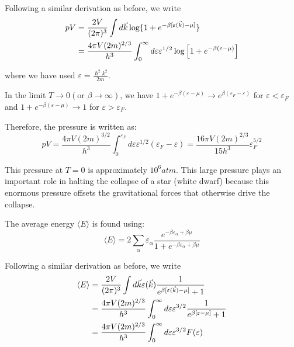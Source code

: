 \documentclass[book.tex]{subfiles}
\begin{document}
Following a similar derivation as before, we write
\begin{align}\label{Eq10}
pV &= \frac{2V}{(2\pi)^3} \int d\vec{k} \log \{ 1 + e^{-\beta [ \varepsilon (\vec{k}) - \mu]} \} \notag\\
&= \frac{4\pi V (2m)^{2/3}}{h^3} \int_0^\infty d\varepsilon \varepsilon^{1/2} \log \left[ 1 + e^{-\beta ( \varepsilon - \mu)} \right]
\end{align}

\noindent where we have used $\varepsilon = \frac{\hslash^2 k^2}{2m}$.

In the limit $T \rightarrow 0 (\text{or } \beta \rightarrow \infty)$, we have $ 1 + e^{-\beta ( \varepsilon - \mu)} \rightarrow  e^{\beta ( \varepsilon_F - \varepsilon)}$ for $\varepsilon < \varepsilon_F$ and $ 1 + e^{-\beta ( \varepsilon - \mu)} \rightarrow 1$ for $\varepsilon > \varepsilon_F$.

Therefore, the pressure is written as:
\begin{equation}\label{Eq11}
pV = \frac{4\pi V (2m)^{3/2}}{h^3} \int_0^{\varepsilon_F} d\varepsilon \varepsilon^{1/2} (\varepsilon_F - \varepsilon) = \frac{16\pi V (2m)^{2/3}}{15h^3} \varepsilon_F^{5/2} 
\end{equation}

This pressure at $T = 0$ is approximately $10^6atm$. This large pressure plays an important role in halting the collapse of a star
(white dwarf) because this enormous pressure offsets the gravitational forces that otherwise drive the collapse.

The average energy $\langle E \rangle$ is found using:
\begin{equation}\label{Eq12}
\langle E \rangle = 2\sum_\alpha \varepsilon_\alpha \frac{e^{-\beta \varepsilon_\alpha + \beta \mu}}{1 + e^{-\beta \varepsilon_\alpha + \beta \mu}}
\end{equation}

Following a similar derivation as before, we write
\begin{align}
\langle E \rangle &= \frac{2V}{(2\pi)^3} \int d\vec{k} \varepsilon(\vec{k}) \frac{1}{e^{\beta [ \varepsilon(\vec{k}) - \mu]}+1} \notag\\
&= \frac{4\pi V (2m)^{2/3}}{h^3} \int_0^\infty d\varepsilon \varepsilon^{3/2} \frac{1}{e^{\beta [ \varepsilon - \mu]}+1} \notag\\
&= \frac{4\pi V (2m)^{2/3}}{h^3} \int_0^\infty d\varepsilon \varepsilon^{3/2} F(\varepsilon) \notag
\end{align}
\end{document}

